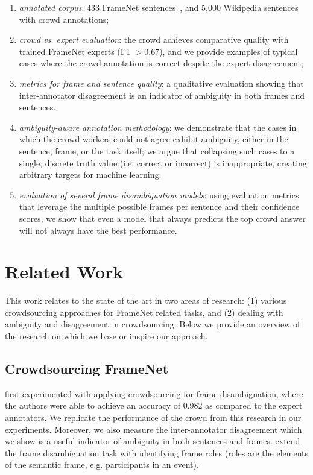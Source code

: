\begin{enumerate}

\item \emph{annotated corpus}: 433 FrameNet sentences~\cite{anca_dumitrache_2018_1472345}, and 5,000 Wikipedia sentences with crowd annotations;

\item \emph{crowd vs. expert evaluation}: the crowd achieves comparative quality with trained FrameNet experts (F1 $>0.67$), and we provide examples of typical cases where the crowd annotation is correct despite the expert disagreement;

\item \emph{metrics for frame and sentence quality}: a qualitative evaluation showing that inter-annotator disagreement is an indicator of ambiguity in both frames and sentences.

\item \emph{ambiguity-aware annotation methodology}: we demonstrate that the cases in which the crowd workers could not agree exhibit ambiguity, either in the sentence, frame, or the task itself; we argue that collapsing such cases to a single, discrete truth value (i.e. correct or incorrect) is inappropriate, creating arbitrary targets for machine learning;

\item \emph{evaluation of several frame disambiguation models}: using evaluation metrics that leverage the multiple possible frames per sentence and their confidence scores, we show that even a model that always predicts the top crowd answer will not always have the best performance.

\end{enumerate}


\section{Related Work}
This work relates to the state of the art in two areas of research: (1) various crowdsourcing approaches for FrameNet related tasks, and (2) dealing with ambiguity and disagreement in crowdsourcing. Below we provide an overview of the research on which we base or inspire our approach. 
\subsection{Crowdsourcing FrameNet}

\citet{Hong:2011:GCR:2018966.2018970} first experimented with applying crowdsourcing for frame disambiguation, where the authors were able to achieve an accuracy of 0.982 as compared to the expert annotators. We replicate the performance of the crowd from this research in our experiments. Moreover, we also measure the inter-annotator disagreement which we show is a useful indicator of ambiguity in both sentences and frames. \citet{fossati2013outsourcing} extend the frame disambiguation task with identifying frame roles (roles are the elements of the semantic frame, e.g. participants in an event).


